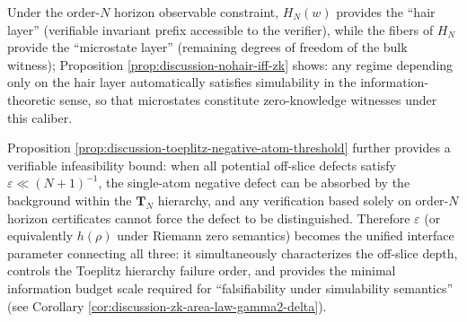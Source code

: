 \begin{remark}[Hair \texorpdfstring{$=$}{=} verifiable invariant; microstate \texorpdfstring{$=$}{=} zero-knowledge witness; \texorpdfstring{$\varepsilon$}{eps} as unified interface parameter]\label{rem:discussion-hair-microstate-eps-interface}
Under the order-\(N\) horizon observable constraint, \(H_N(w)\) provides the ``hair layer'' (verifiable invariant prefix accessible to the verifier), while the fibers of \(H_N\) provide the ``microstate layer'' (remaining degrees of freedom of the bulk witness); Proposition \ref{prop:discussion-nohair-iff-zk} shows: any regime depending only on the hair layer automatically satisfies simulability in the information-theoretic sense, so that microstates constitute zero-knowledge witnesses under this caliber.
\par
Proposition \ref{prop:discussion-toeplitz-negative-atom-threshold} further provides a verifiable infeasibility bound: when all potential off-slice defects satisfy \(\varepsilon\ll (N+1)^{-1}\), the single-atom negative defect can be absorbed by the background within the \(\mathbf{T}_N\) hierarchy, and any verification based solely on order-\(N\) horizon certificates cannot force the defect to be distinguished.
Therefore \(\varepsilon\) (or equivalently \(h(\rho)\) under Riemann zero semantics) becomes the unified interface parameter connecting all three: it simultaneously characterizes the off-slice depth, controls the Toeplitz hierarchy failure order, and provides the minimal information budget scale required for ``falsifiability under simulability semantics'' (see Corollary \ref{cor:discussion-zk-area-law-gamma2-delta}).
\end{remark}

